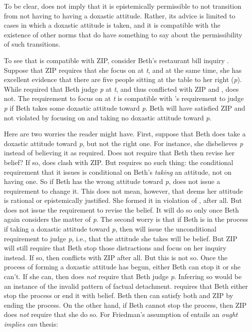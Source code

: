 \documentclass[12pt]{article}
\begin{document}
To be clear, \eoc{} does not imply that it is epistemically permissible to not transition from not having to having a doxastic attitude. Rather, its advice is limited to cases in which a doxastic attitude is taken, and it is compatible with the existence of other norms that do have something to say about the permissibility of such transitions.

To see that \eoc{} is compatible with ZIP, consider Beth's restaurant bill inquiry . Suppose that ZIP requires that she focus on  at \textit{t}, and at the same time, she has excellent evidence that there are five people sitting at the table to her right (\textit{p}). While \eo{} required that Beth judge \textit{p} at \textit{t}, and thus conflicted with ZIP and \opic{}, \eoc{} does not. The requirement to focus on  at \textit{t} is compatible with \eoc{}'s requirement to judge \textit{p} if Beth takes some doxastic attitude toward \textit{p}. Beth will have satisfied ZIP and not violated \eoc{} by focusing on  and taking no doxastic attitude toward \textit{p}.

Here are two worries the reader might have. First, suppose that Beth does take a doxastic attitude toward \textit{p}, but not the right one. For instance, she disbelieves \textit{p} instead of believing it as required. Does \eoc{} not require that Beth then revise her belief? If so, \eoc{} does clash with ZIP. But \eoc{} requires no such thing: the conditional requirement that it issues is conditional on Beth's \textit{taking} an attitude, not on having one. So if Beth has the wrong attitude toward \textit{p}, \eoc{} does not issue a requirement to change it. This does not mean, however, that \eoc{} deems her attitude is rational or epistemically justified. She formed it in violation of \eoc{}, after all. But \eoc{} does not issue the requirement to revise the belief. It will do so only once Beth again considers the matter of \textit{p}. The second worry is that if Beth is in the process if taking a doxastic attitude toward \textit{p}, then \eoc{} will issue the unconditional requirement to judge \textit{p}, i.e., that the attitude she takes will be belief. But ZIP will still require that Beth stop those distractions and focus on her inquiry instead. If so, then \eoc{} conflicts with ZIP after all. But this is not so. Once the process of forming a doxastic attitude has begun, either Beth can stop it or she can't. If she can, then \eoc{} does \textit{not} require that Beth judge \textit{p}. Inferring so would be an instance of the invalid pattern of factual detachment. \eoc{} requires that Beth either stop the process or end it with belief. Beth then can satisfy both \eoc{} and ZIP by ending the process. On the other hand, if Beth cannot stop the process, then ZIP does \textit{not} require that she do so. For Friedman's assumption of \opic{} entails an \textit{ought implies can} thesis:
\end{document}
